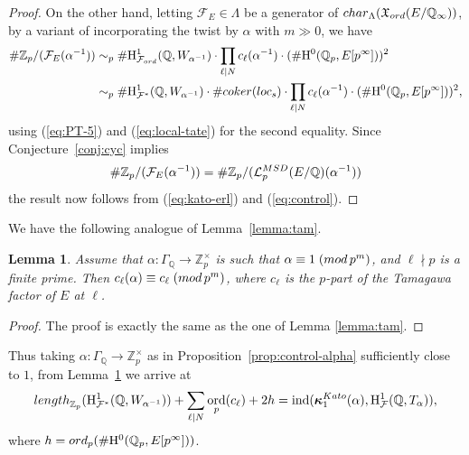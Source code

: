 \documentclass[10pt,reqno]{amsart}
\numberwithin{equation}{section}
\theoremstyle{plain}
\theoremstyle{definition}
\theoremstyle{definition}
\theoremstyle{plain}
\theoremstyle{plain}
\newtheorem{lemma}[thm]{Lemma}
\theoremstyle{plain}
\theoremstyle{plain}
\theoremstyle{plain}
\theoremstyle{plain}
\DeclareMathOperator{\ord}{ord}
\newcommand{\ind}{\operatorname{ind}}
\newcommand{\Z}{\mathbb{Z}}
\newcommand{\Q}{\mathbb{Q}}
\newcommand{\Zp}{\mathbb{Z}_{p}}
\newcommand{\X}{\mathfrak{X}}
\newcommand{\bkappa}{\boldsymbol{\kappa}}
\newcommand{\Lcal}{\mathcal{L}}
\newcommand{\Fcal}{\mathcal{F}}
\newcommand{\rH}{\mathrm{H}}
\begin{document}
\begin{proof}
On the other hand, letting $\Fcal_E\in\Lambda$ be a generator of ${\rm char}_\Lambda(\X_{\rm ord}(E/\Q_\infty))$, by a variant of \cite[Thm.~4.1]{greenberg-cetraro} incorporating the twist by $\alpha$ with $m\gg 0$, we have
\begin{equation}\label{eq:control}
\begin{aligned}
\#\Zp/(\Fcal_E(\alpha^{-1}))&\sim_p\#\rH^1_{\Fcal_{\rm ord}}(\Q,W_{\alpha^{-1}})\cdot\prod_{\ell\vert N}c_\ell(\alpha^{-1})\cdot(\#\rH^0(\Q_p,E[p^\infty]))^2\\
&\sim_p\#\rH^1_{\Fcal^*}(\Q,W_{\alpha^{-1}})\cdot\#{\rm coker}({\rm loc}_s)\cdot\prod_{\ell\vert N}c_\ell(\alpha^{-1})\cdot(\#\rH^0(\Q_p,E[p^\infty]))^2,
\end{aligned}
\end{equation}
using (\ref{eq:PT-5}) and (\ref{eq:local-tate}) for the second equality. Since Conjecture~\ref{conj:cyc} implies 
\[
\#\Z_p/(\Fcal_E(\alpha^{-1}))=\#\Z_p/(\Lcal_p^{\rm MSD}(E/\Q)(\alpha^{-1}))
\] 
the result now follows from (\ref{eq:kato-erl}) and (\ref{eq:control}).
\end{proof}

We have the following analogue of Lemma~\ref{lemma:tam}.

\begin{lemma}\label{lem:tamQ}
Assume that $\alpha:\Gamma_\Q\rightarrow\Z_p^\times$ is such that $\alpha\equiv 1\;({\rm mod}\,p^m)$,  and $\ell\nmid p$ is a finite prime. Then $c_\ell(\alpha) \equiv c_\ell\;({\rm mod}\,p^m)$, where $c_\ell$ is the $p$-part of the Tamagawa factor of $E$ at $\ell$.
\end{lemma}

\begin{proof}
The proof is exactly the same as the one of Lemma \ref{lemma:tam}.
\end{proof}

Thus taking $\alpha:\Gamma_{\Q}\to\Z_p^{\times}$ as in Proposition~\ref{prop:control-alpha} sufficiently close to $1$, from Lemma~\ref{lem:tamQ} we arrive at
\begin{equation}\label{eq:cycMCalpha}
{\rm length}_{\Z_p}(\rH^1_{\Fcal^*}(\Q, W_{\alpha^{-1}}))+ \sum_{\ell\mid N} \ord_p(c_\ell)+2h= \ind(\bkappa^{\rm Kato}_1(\alpha),\rH^1_{\Fcal}(\Q,T_{\alpha})),
\end{equation}
where $h={\rm ord}_p(\#\rH^0(\Q_p,E[p^\infty]))$.


\end{document}
